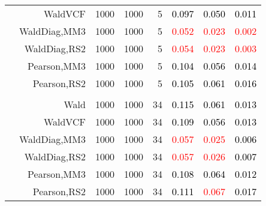 \documentclass[
]{article}
\begin{document}
\begin{table}[H]
{\begin{tabular}[t]{lrrrrrrr}
\hspace{1em} & WaldVCF & 1000 & 1000 & 5 & \textcolor{black}{0.097} & \textcolor{black}{0.050} & \textcolor{black}{0.011}\\

\hspace{1em} & WaldDiag,MM3 & 1000 & 1000 & 5 & \textcolor{red}{0.052} & \textcolor{red}{0.023} & \textcolor{red}{0.002}\\

\hspace{1em} & WaldDiag,RS2 & 1000 & 1000 & 5 & \textcolor{red}{0.054} & \textcolor{red}{0.023} & \textcolor{red}{0.003}\\

\hspace{1em} & Pearson,MM3 & 1000 & 1000 & 5 & \textcolor{black}{0.104} & \textcolor{black}{0.056} & \textcolor{black}{0.014}\\

\hspace{1em} & Pearson,RS2 & 1000 & 1000 & 5 & \textcolor{black}{0.105} & \textcolor{black}{0.061} & \textcolor{black}{0.016}\\
\cmidrule{1-8}
\addlinespace[0.3em]
\multicolumn{8}{l}{\textbf{3F 15V}}\\
\hspace{1em} & Wald & 1000 & 1000 & 34 & \textcolor{black}{0.115} & \textcolor{black}{0.061} & \textcolor{black}{0.013}\\

\hspace{1em} & WaldVCF & 1000 & 1000 & 34 & \textcolor{black}{0.109} & \textcolor{black}{0.056} & \textcolor{black}{0.013}\\

\hspace{1em} & WaldDiag,MM3 & 1000 & 1000 & 34 & \textcolor{red}{0.057} & \textcolor{red}{0.025} & \textcolor{black}{0.006}\\

\hspace{1em} & WaldDiag,RS2 & 1000 & 1000 & 34 & \textcolor{red}{0.057} & \textcolor{red}{0.026} & \textcolor{black}{0.007}\\

\hspace{1em} & Pearson,MM3 & 1000 & 1000 & 34 & \textcolor{black}{0.108} & \textcolor{black}{0.064} & \textcolor{black}{0.012}\\

\hspace{1em} & Pearson,RS2 & 1000 & 1000 & 34 & \textcolor{black}{0.111} & \textcolor{red}{0.067} & \textcolor{black}{0.017}\\
\bottomrule
\end{tabular}}
\endgroup{}
\end{table}
\end{document}
